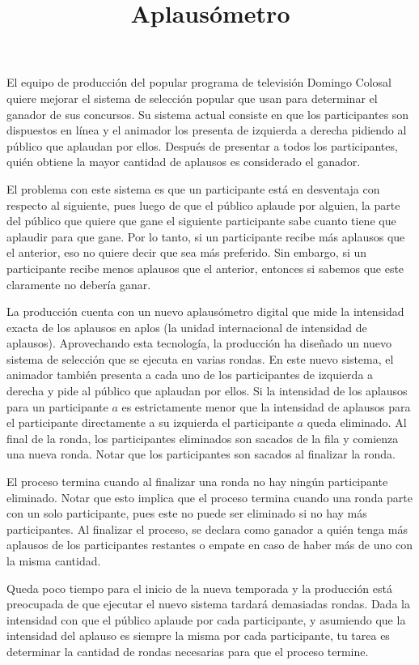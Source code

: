 \documentclass{oci}
\title{Aplausómetro}
\begin{document}
\begin{problemDescription}
El equipo de producción del popular programa de televisión
Domingo Colosal quiere mejorar el sistema de selección
popular que usan para determinar el ganador de sus concursos.
%
Su sistema actual consiste en que los participantes
son dispuestos en línea y el animador los presenta de
izquierda a derecha pidiendo al público que aplaudan por ellos.
%
Después de presentar a todos los participantes, quién obtiene
la mayor cantidad de aplausos es considerado el ganador.

El problema con este sistema es que
un participante está en desventaja con respecto
al siguiente, pues luego de que el público aplaude por
alguien, la parte del público que quiere que gane el siguiente
participante sabe cuanto tiene que aplaudir para que
gane.
%
Por lo tanto, si un participante recibe más aplausos
que el anterior, eso no quiere decir que sea más preferido.
%
Sin embargo, si un participante recibe menos aplausos
que el anterior, entonces si sabemos que este claramente
no debería ganar.

La producción cuenta con un nuevo aplausómetro digital
que mide la intensidad exacta de los aplausos en aplos
(la unidad internacional de intensidad de aplausos).
%
Aprovechando esta tecnología, la producción ha diseñado
un nuevo sistema de selección que se ejecuta en varias rondas.
%
En este nuevo sistema, el animador también presenta a cada uno
de los participantes de izquierda a derecha y pide al público
que aplaudan por ellos.
%
Si la intensidad de los aplausos para un participante $a$ es estrictamente
menor que la intensidad de aplausos para el participante directamente a
su izquierda el participante $a$ queda eliminado.
%
Al final de la ronda, los participantes eliminados son sacados
de la fila y comienza una nueva ronda.
%
Notar que los participantes son sacados al finalizar la ronda.

El proceso termina cuando al finalizar una ronda
no hay ningún participante eliminado.
%
Notar que esto implica que el proceso termina cuando una
ronda parte con un solo participante, pues este no puede
ser eliminado si no hay más participantes.
%
Al finalizar el proceso, se declara como ganador a quién
tenga más aplausos de los participantes restantes o empate
en caso de haber más de uno con la misma cantidad.

Queda poco tiempo para el inicio de la nueva temporada
y la producción está preocupada de que ejecutar el nuevo sistema
tardará demasiadas rondas.
%
Dada la intensidad con que el público aplaude por cada participante,
y asumiendo que la intensidad del aplauso es siempre la misma por
cada participante, tu tarea es determinar la cantidad de rondas
necesarias para que el proceso termine.
\end{problemDescription}
\end{document}
